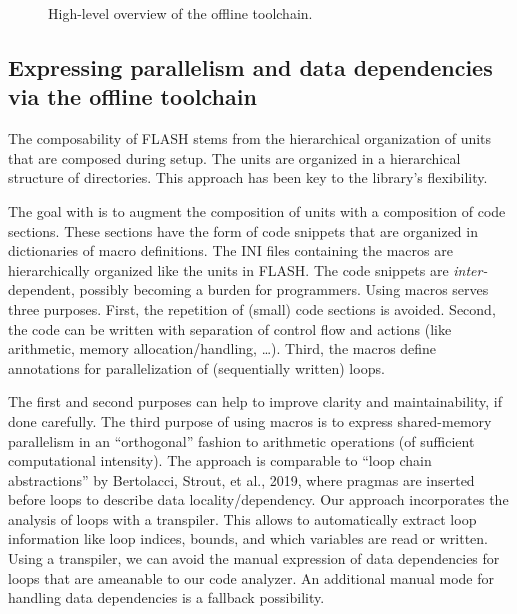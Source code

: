 \documentclass{article}
\begin{document}
\begin{figure}
  \caption{High-level overview of the offline toolchain.}
  \label{fig:high-level-offline-toolchain}
\end{figure}


\subsection{Expressing parallelism and data dependencies via the offline toolchain}
\label{sec:expressing-parallelism-and-data-dependencies}

The composability of FLASH stems from the hierarchical organization of
units that are composed during setup.  The units are organized in a
hierarchical structure of directories.  This approach has been key to the
library's flexibility.

The goal with \FlashOfTheFuture is to augment the composition of units
with a composition of code sections.  These sections have the form of code
snippets that are organized in dictionaries of macro definitions.  The INI
files containing the macros are hierarchically organized like the units in FLASH.  The code
snippets are \emph{inter-}dependent, possibly becoming a burden for
programmers.  Using macros serves three purposes.  First, the
repetition of (small) code sections is avoided.  Second, the code can be
written with separation of control flow and actions (like arithmetic, memory
allocation/handling, \ldots).  Third, the macros define annotations for
parallelization of (sequentially written) loops.

The first and second purposes can help to improve clarity and maintainability,
if done carefully.  The third purpose of using macros is to express
shared-memory parallelism in an ``orthogonal'' fashion to arithmetic operations
(of sufficient computational intensity).  The approach is comparable to ``loop
chain abstractions'' by Bertolacci, Strout, et al., 2019, where pragmas are
inserted before loops to describe data locality/dependency.  Our approach
incorporates the analysis of loops with a transpiler.  This allows to
automatically extract loop information like loop indices, bounds, and which
variables are read or written.  Using a
transpiler, we can avoid the manual expression of
data dependencies for loops that are ameanable to our code analyzer.
An additional manual mode for handling data dependencies is a fallback possibility.
\end{document}
